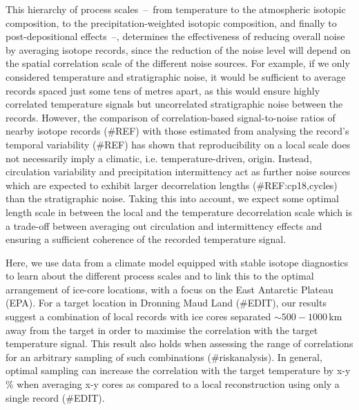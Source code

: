 \documentclass[cp, manuscript]{copernicus}
\begin{document}
This hierarchy of process scales~--~from temperature to the atmospheric isotopic
composition, to the precipitation-weighted isotopic composition, and finally to
post-depositional effects~--, determines the effectiveness of reducing overall
noise by averaging isotope records, since the reduction of the noise level will
depend on the spatial correlation scale of the different noise sources. For
example, if we only considered temperature and stratigraphic noise, it would be
sufficient to average records spaced just some tens of metres apart, as this
would ensure highly correlated temperature signals but uncorrelated
stratigraphic noise between the records. However, the comparison of
correlation-based signal-to-noise ratios of nearby isotope records (\#REF) with
those estimated from analysing the record's temporal variability (\#REF) has
shown that reproducibility on a local scale does not necessarily imply a
climatic, i.e. temperature-driven, origin. Instead, circulation variability and
precipitation intermittency act as further noise sources which are expected to
exhibit larger decorrelation lengths (\#REF:cp18,cycles) than the stratigraphic
noise. Taking this into account, we expect some optimal length scale in between
the local and the temperature decorrelation scale which is a trade-off between
averaging out circulation and intermittency effects and ensuring a sufficient
coherence of the recorded temperature signal.

Here, we use data from a climate model equipped with stable isotope diagnostics
to learn about the different process scales and to link this to the optimal
arrangement of ice-core locations, with a focus on the East Antarctic Plateau
(EPA). For a target location in Dronning Maud Land (\#EDIT), our results suggest
a combination of local records with ice cores separated $\sim500-1000$\,km away
from the target in order to maximise the correlation with the target temperature
signal. This result also holds when assessing the range of correlations for an
arbitrary sampling of such combinations (\#riskanalysis). In general, optimal
sampling can increase the correlation with the target temperature by x-y\,\%
when averaging x-y cores as compared to a local reconstruction using only a
single record (\#EDIT).
\end{document}
